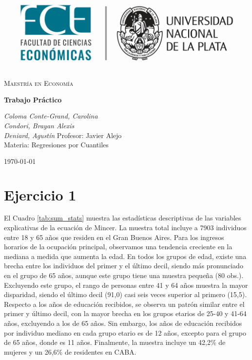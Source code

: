 \documentclass[11pt]{article}
\begin{document}
   


\begin{titlepage}
    \centering
    \vspace*{2cm}
    \includegraphics[width=1\textwidth]{logo.png} 
    
    \vspace{2cm}
    {\scshape\LARGE Maestría en Economía} \\
    
    \vspace{0.5cm}
    {\huge\bfseries
    Trabajo Práctico\par}
    \vspace{2cm}
    {\LARGE\itshape Coloma Conte-Grand, Carolina} \\
    
    {\LARGE\itshape Condori, Brayan Alexis} \\
    
    {\LARGE\itshape Deniard, Agustín}
    \vfill
    {\Large Profesor: Javier Alejo} \\
    \vspace{0.5cm}
    {\Large Materia: Regresiones por Cuantiles}

    \vfill

    {\Large \today\par}
\end{titlepage}

\justify 

\section*{Ejercicio 1}


El Cuadro \ref{tab:sum_stats} muestra las estadísticas descriptivas de las variables explicativas de la ecuación de Mincer. La muestra total incluye a 7903 individuos entre 18 y 65 años que residen en el Gran Buenos Aires. Para los ingresos horarios de la ocupación principal, observamos una tendencia creciente en la mediana a medida que aumenta la edad. En todos los grupos de edad, existe una brecha entre los individuos del primer y el último decil, siendo más pronunciado en el grupo de 65 años, aunque este grupo tiene una muestra pequeña (80 obs.). Excluyendo este grupo, el rango de personas entre 41 y 64 años muestra la mayor disparidad, siendo el último decil (91,0) casi seis veces superior al primero (15,5). Respecto a los años de educación recibidos, se observa un patrón similar entre el primer y último decil, con la mayor brecha en los grupos etarios de 25-40 y 41-64 años, excluyendo a los de 65 años. Sin embargo, los años de educación recibidos por individuo mediano en cada grupo etario es de 12 años, excepto para el grupo de 65 años, donde es 11 años. Finalmente, la muestra incluye un 42,2\% de mujeres y un 26,6\% de residentes en CABA.
\end{document}
